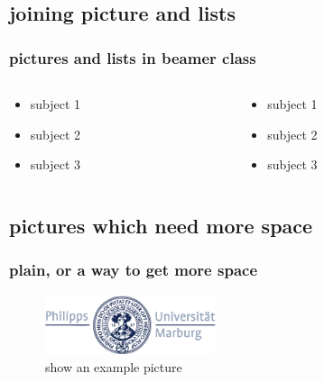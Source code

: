 \documentclass[11pt]{beamer}
\begin{document}
    \subsection{joining picture and lists}

    \begin{frame}
        \frametitle{pictures and lists in beamer class}
        \begin{columns}
            \begin{column}{5cm}
                \begin{itemize}
                    \item<1-> subject 1
                    \item<3-> subject 2
                    \item<5-> subject 3
                \end{itemize}
                \vspace{3cm}
            \end{column}
            \begin{column}{5cm}
                \begin{itemize}
                    \item<1-> subject 1
                    \item<3-> subject 2
                    \item<5-> subject 3
                \end{itemize}
            \end{column}
        \end{columns}
    \end{frame}


    \subsection{pictures which need more space}
    \begin{frame}[plain]
        \frametitle{plain, or a way to get more space}
        \begin{figure}
            \includegraphics[width=5cm]{gfx/logo_blue}
            \caption{show an example picture}
        \end{figure}
    \end{frame}
\end{document}
